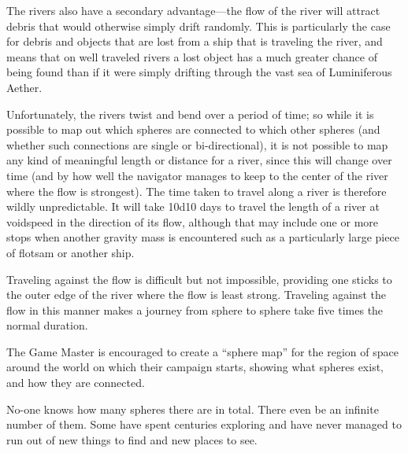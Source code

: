 \begin{multicols*}{2}
The rivers also have a secondary advantage—the flow of the river will attract debris that would otherwise simply drift randomly. This is particularly the case for debris and objects that are lost from a ship that is traveling the river, and means that on well traveled rivers a lost object has a much greater chance of being found than if it were simply drifting through the vast sea of Luminiferous Aether.

Unfortunately, the rivers twist and bend over a period of time; so while it is possible to map out which spheres are connected to which other spheres (and whether such connections are single or bi-directional), it is not possible to map any kind of meaningful length or distance for a river, since this will change over time (and by how well the navigator manages to keep to the center of the river where the flow is strongest). The time taken to travel along a river is therefore wildly unpredictable. It will take 10d10 days to travel the length of a river at voidspeed in the direction of its flow, although that may include one or more stops when another gravity mass is encountered such as a particularly large piece of flotsam or another ship.

Traveling against the flow is difficult but not impossible, providing one sticks to the outer edge of the river where the flow is least strong. Traveling against the flow in this manner makes a journey from sphere to sphere take five times the normal duration.

The Game Master is encouraged to create a “sphere map” for the region of space around the world on which their campaign starts, showing what spheres exist, and how they are connected.

No-one knows how many spheres there are in total. There even be an infinite number of them. Some  have spent centuries exploring and have never managed to run out of new things to find and new places to see.

\end{multicols*}

